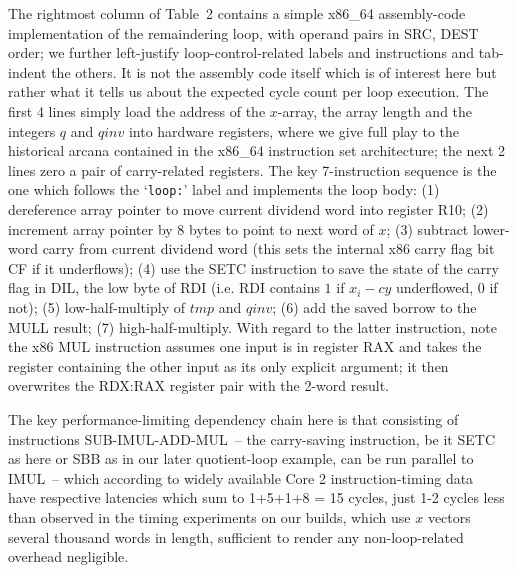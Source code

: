 \documentclass{article}
\begin{document}
The rightmost column of Table~2 contains a simple x86\_64 assembly-code implementation of the remaindering loop, with operand pairs in SRC, DEST order; we further left-justify loop-control-related labels and instructions and tab-indent the others. It is not the assembly code itself which is of interest here but rather what it tells us about the expected cycle count per loop execution. The first 4 lines simply load the address of the $x$-array, the array length and the integers $q$ and $qinv$ into hardware registers, where we give full play to the historical arcana contained in the x86\_64 instruction set architecture; the next 2 lines zero a pair of carry-related registers. The key 7-instruction sequence is the one which follows the `{\tt loop:}' label and implements the loop body: (1) dereference array pointer to move current dividend word into register R10; (2) increment array pointer by 8 bytes to point to next word of $x$; (3) subtract lower-word carry from current dividend word (this sets the internal x86 carry flag bit CF if it underflows); (4) use the SETC instruction to save the state of the carry flag in DIL, the low byte of RDI (i.e. RDI contains $1$ if $x_i - cy$ underflowed, 0 if not); (5) low-half-multiply of $tmp$ and $qinv$; (6) add the saved borrow to the MULL result; (7) high-half-multiply. With regard to the latter instruction, note the x86 MUL instruction assumes one input is in register RAX and takes the register containing the other input as its only explicit argument; it then overwrites the RDX:RAX register pair with the 2-word result.

The key performance-limiting dependency chain here is that consisting of instructions SUB-IMUL-ADD-MUL~-- the carry-saving instruction, be it SETC as here or SBB as in our later quotient-loop example, can be run parallel to IMUL~-- which according to widely available Core 2 instruction-timing data~\cite{agner} have respective latencies which sum to 1+5+1+8 = 15 cycles, just 1-2 cycles less than  observed in the timing experiments on our builds, which use $x$ vectors several thousand words in length, sufficient to render any non-loop-related overhead negligible.
\end{document}
